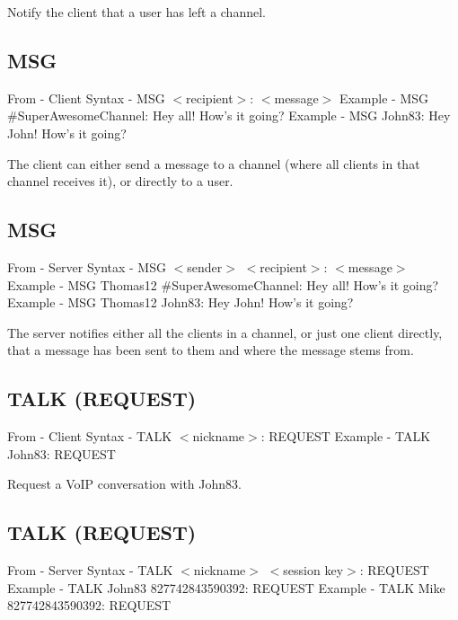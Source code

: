 \documentclass[12pt]{rapport}
\begin{document}
\noindent Notify the client that a user has left a channel.

\subsection*{MSG}
From    - Client\newline
Syntax  - MSG $<$recipient$>$: $<$message$>$\newline
Example - MSG \#SuperAwesomeChannel: Hey all! How's it going?\newline
Example - MSG John83: Hey John! How's it going?\newline

\noindent The client can either send a message to a channel (where all
clients in that channel receives it), or directly to a user.

\subsection*{MSG}
From    - Server\newline
Syntax  - MSG $<$sender$>$ $<$recipient$>$: $<$message$>$\newline
Example - MSG Thomas12 \#SuperAwesomeChannel: Hey all! How's it going?\newline
Example - MSG Thomas12 John83: Hey John! How's it going?\newline

\noindent The server notifies either all the clients in a channel, or
just one client directly, that a message has been sent to them and
where the message stems from.

\subsection*{TALK (REQUEST)}
From    - Client\newline
Syntax  - TALK $<$nickname$>$: REQUEST\newline
Example - TALK John83: REQUEST\newline

\noindent Request a VoIP conversation with John83.

\subsection*{TALK (REQUEST)}
From    - Server\newline
Syntax  - TALK $<$nickname$>$ $<$session key$>$: REQUEST\newline
Example - TALK John83 827742843590392: REQUEST\newline
Example - TALK Mike 827742843590392: REQUEST\newline
\end{document}
